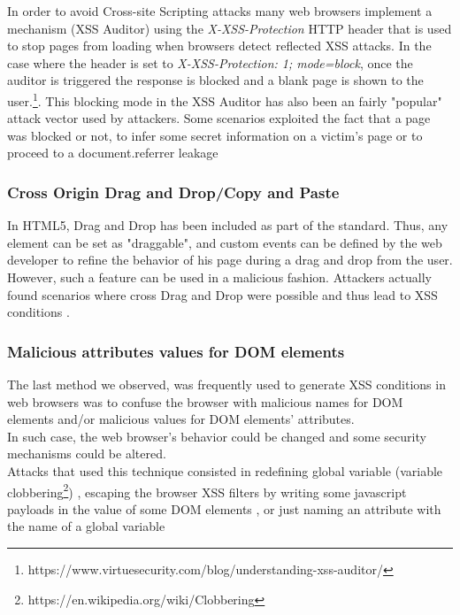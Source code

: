 \documentclass[journal]{IEEEtran}
\begin{document}
In order to avoid Cross-site Scripting attacks many web browsers implement a mechanism (XSS Auditor) using the \emph{X-XSS-Protection} HTTP header that is used to stop pages from loading when browsers detect reflected XSS attacks. In the case where the header is set to \emph{X-XSS-Protection: 1; mode=block}, once the auditor is triggered the response is blocked and a blank page is shown to the user.\footnote{https://www.virtuesecurity.com/blog/understanding-xss-auditor/}. This blocking mode in the XSS Auditor has also been an fairly "popular" attack vector used by attackers. Some scenarios exploited the fact that a page was blocked or not, to infer some secret information on a victim's page or to proceed to a document.referrer leakage \cite{CVE-2017-5045} \cite{CVE-2013-0909} \cite{CVE-2013-2848}

\medskip

\subsubsection*{\textbf{Cross Origin Drag and Drop/Copy and Paste}}

In HTML5, Drag and Drop has been included as part of the standard. Thus, any element can be set as "draggable", and custom events can be defined by the web developer to refine the behavior of his page during a drag and drop from the user. However, such a feature can be used in a malicious fashion. Attackers actually found scenarios where cross Drag and Drop were possible and thus lead to XSS conditions \cite{CVE-2016-5226} \cite{CVE-2013-2849} \cite{CVE-2012-0455}.

\medskip

\subsubsection*{\textbf{Malicious attributes values for DOM elements}}

The last method we observed, was frequently used to generate XSS conditions in web browsers was to confuse the browser with malicious names for DOM elements and/or malicious values for DOM elements' attributes. \\
In such case, the web browser's behavior could be changed and some security mechanisms could be altered. \\
Attacks that used this technique consisted in redefining global variable (variable clobbering\footnote{https://en.wikipedia.org/wiki/Clobbering}) \cite{frameBustingLocationClubbered}, escaping the browser XSS filters by writing some javascript payloads in the value of some DOM elements \cite{CVE-2013-2849}, or just naming an attribute with the name of a global variable \cite{CVE-2012-4209} \cite{CVE-2012-3994} \cite{CVE-2012-4194}
\end{document}
